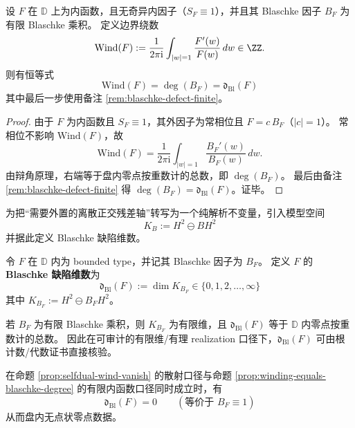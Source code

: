 \begin{proposition}[绕数=\texorpdfstring{$\deg(B_F)$}{deg(B)}（有限 Blaschke/无奇异内因子口径）]\label{prop:winding-equals-blaschke-degree}
设 \(F\) 在 \(\mathbb{D}\) 上为内函数，且无奇异内因子（\(S_F\equiv 1\)），并且其 Blaschke 因子 \(B_F\) 为有限 Blaschke 乘积。
定义边界绕数
\[
\mathrm{Wind}(F):=\frac{1}{2\pi\mathrm{i}}\int_{|w|=1}\frac{F'(w)}{F(w)}\,dw\in\ZZ.
\]
则有恒等式
\[
\boxed{\;\mathrm{Wind}(F)=\deg(B_F)=\mathfrak d_{\mathrm{Bl}}(F)\;}
\]
其中最后一步使用备注 \ref{rem:blaschke-defect-finite}。
\end{proposition}

\begin{proof}
由于 \(F\) 为内函数且 \(S_F\equiv 1\)，其外因子为常相位且 \(F=c\,B_F\)（\(|c|=1\)）。
常相位不影响 \(\mathrm{Wind}(F)\)，故
\[
\mathrm{Wind}(F)=\frac{1}{2\pi\mathrm{i}}\int_{|w|=1}\frac{B_F'(w)}{B_F(w)}\,dw.
\]
由辩角原理，右端等于盘内零点按重数计的总数，即 \(\deg(B_F)\)。
最后由备注 \ref{rem:blaschke-defect-finite} 得 \(\deg(B_F)=\mathfrak d_{\mathrm{Bl}}(F)\)。证毕。
\end{proof}
\par
为把“需要外置的离散正交残差轴”转写为一个纯解析不变量，引入模型空间
\[
K_B:=H^2\ominus BH^2
\]
并据此定义 Blaschke 缺陷维数。

\begin{definition}\label{def:blaschke-defect-dimension}
令 \(F\) 在 \(\mathbb{D}\) 内为 bounded type，并记其 Blaschke 因子为 \(B_F\)。
定义 \(F\) 的\textbf{Blaschke 缺陷维数}为
\[
\boxed{\;\mathfrak{d}_{\mathrm{Bl}}(F):=\dim K_{B_F}\in\{0,1,2,\dots,\infty\}\;}
\]
其中 \(K_{B_F}:=H^2\ominus B_FH^2\)。
\end{definition}

\begin{remark}\label{rem:blaschke-defect-finite}
若 \(B_F\) 为有限 Blaschke 乘积，则 \(K_{B_F}\) 为有限维，且 \(\mathfrak{d}_{\mathrm{Bl}}(F)\) 等于 \(\mathbb{D}\) 内零点按重数计的总数。
因此在可审计的有限维/有理 realization 口径下，\(\mathfrak{d}_{\mathrm{Bl}}(F)\) 可由根计数/代数证书直接核验。
\end{remark}

\begin{corollary}\label{cor:selfdual-index-vanish-implies-dbl0}
在命题 \ref{prop:selfdual-wind-vanish} 的散射口径与命题 \ref{prop:winding-equals-blaschke-degree} 的有限内函数口径同时成立时，有
\[
\boxed{\;\mathfrak d_{\mathrm{Bl}}(F)=0\qquad(\text{等价于 }B_F\equiv 1)\;}
\]
从而盘内无点状零点数据。
\end{corollary}

